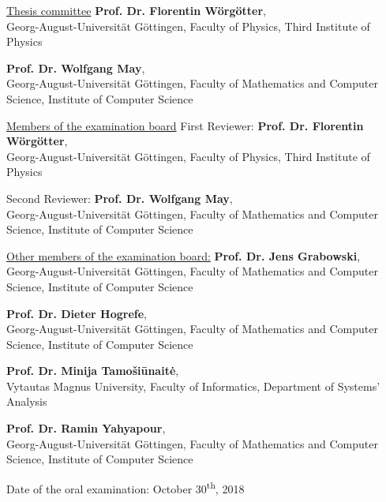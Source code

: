 
\maketitle

\cleardoublepage
\newpage \thispagestyle{empty}
\underline{Thesis committee}
\vskip 2.0mm
\textbf{Prof. Dr. Florentin W\"org\"otter}, \\
\small Georg-August-Universit\"at G\"ottingen, Faculty of Physics, Third Institute of Physics

\vskip 0.05cm
\normalsize \textbf{Prof. Dr. Wolfgang May}, \\
\small Georg-August-Universit\"at G\"ottingen, Faculty of Mathematics and Computer Science, Institute of Computer Science

\vskip 4.0mm
\normalsize \underline{Members of the examination board}
\vskip 2.0mm
\normalsize First Reviewer: \textbf{Prof. Dr. Florentin W\"org\"otter}, \\
\small Georg-August-Universit\"at G\"ottingen, Faculty of Physics, Third Institute of Physics

\vskip 0.05cm
\normalsize Second Reviewer: \textbf{Prof. Dr. Wolfgang May}, \\
\small Georg-August-Universit\"at G\"ottingen, Faculty of Mathematics and Computer Science, Institute of Computer Science

\vskip 4.0mm
\normalsize \underline{Other members of the examination board:}
\vskip 0.05cm
\normalsize \textbf{Prof. Dr. Jens Grabowski}, \\
\small Georg-August-Universit\"at G\"ottingen, Faculty of Mathematics and Computer Science, Institute of Computer Science

\vskip 0.05cm
\normalsize \textbf{Prof. Dr. Dieter Hogrefe}, \\
\small Georg-August-Universit\"at G\"ottingen, Faculty of Mathematics and Computer Science, Institute of Computer Science

\vskip 2.0mm
\normalsize \textbf{Prof. Dr. Minija Tamo\v{s}i\={u}nait\.{e}}, \\
\small Vytautas Magnus University, Faculty of Informatics, Department of Systems’ Analysis

\vskip 0.05cm
\normalsize \textbf{Prof. Dr. Ramin Yahyapour}, \\
\small Georg-August-Universit\"at G\"ottingen, Faculty of Mathematics and Computer Science, Institute of Computer Science


\normalsize

\vfill
Date of the oral examination: \hfill October 30\textsuperscript{th}, 2018

